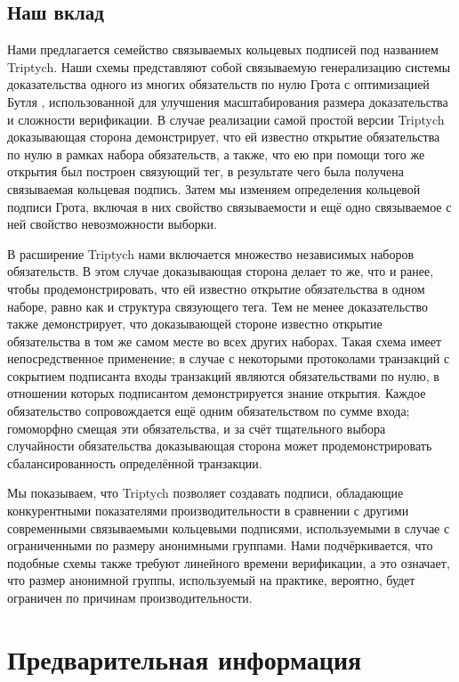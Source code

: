 \documentclass{article}
\theoremstyle{definition}
\begin{document}
\subsection{Наш вклад}
Нами предлагается семейство связываемых кольцевых подписей под названием Triptych. Наши схемы представляют собой связываемую генерализацию системы доказательства одного из многих обязательств по нулю Грота \cite{groth} с оптимизацией Бутля \cite{bootle}, использованной для улучшения масштабирования размера доказательства и сложности верификации. В случае реализации самой простой версии Triptych доказывающая сторона демонстрирует, что ей известно открытие обязательства по нулю в рамках набора обязательств, а также, что ею при помощи того же открытия был построен связующий тег, в результате чего была получена связываемая кольцевая подпись. Затем мы изменяем определения кольцевой подписи Грота, включая в них свойство связываемости и ещё одно связываемое с ней свойство невозможности выборки.

В расширение Triptych нами включается множество независимых наборов обязательств. В этом случае доказывающая сторона делает то же, что и ранее, чтобы продемонстрировать, что ей известно открытие обязательства в одном наборе, равно как и структура связующего тега. Тем не менее доказательство также демонстрирует, что доказывающей стороне известно открытие обязательства в том же самом месте во всех других наборах. Такая схема имеет непосредственное применение; в случае с некоторыми протоколами транзакций с сокрытием подписанта входы транзакций являются обязательствами по нулю, в отношении которых подписантом демонстрируется знание открытия. Каждое обязательство сопровождается ещё одним обязательством по сумме входа; гомоморфно смещая эти обязательства, и за счёт тщательного выбора случайности обязательства доказывающая сторона может продемонстрировать сбалансированность определённой транзакции.

Мы показываем, что Triptych позволяет создавать подписи, обладающие конкурентными показателями производительности в сравнении с другими современными связываемыми кольцевыми подписями, используемыми в случае с ограниченными по размеру анонимными группами. Нами подчёркивается, что подобные схемы также требуют линейного времени верификации, а это означает, что размер анонимной группы, используемый на практике, вероятно, будет ограничен по причинам производительности.


\section{Предварительная информация}
\end{document}
